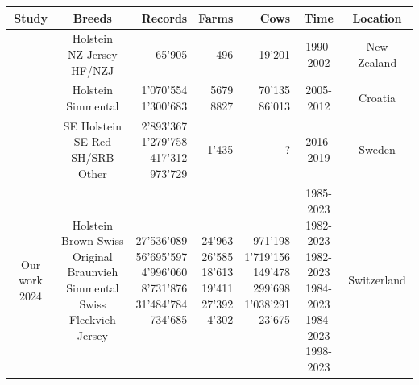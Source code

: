 \begin{table}[H]
    \centering
    \begin{tabular}{ccrrrcc}
        \textbf{Study} & \textbf{Breeds} & \textbf{Records} & \textbf{Farms} & \textbf{Cows} & \textbf{Time} & \textbf{Location} \\
        \hline
        \hline
        \multrow{\citeauthor{bryant_quantifying_2007} \\ \citeyear{bryant_quantifying_2007}} & \multrow{Holstein \\ NZ Jersey \\ HF/NZJ} & 65'905 & 496 & 19'201 & 1990-2002 & New Zealand \\
        \hline
        \multrow{\citeauthor{gantner_differences_2017} \\ \citeyear{gantner_differences_2017}} & \multrow{Holstein \\ Simmental} & \multrow{1'070'554 \\ 1'300'683} & \multrow{5679 \\ 8827} & \multrow{70'135 \\ 86'013} & 2005-2012 & Croatia \\
        \hline
        \multrow{\citeauthor{ahmed_temperature_2022} \\ \citeyear{ahmed_temperature_2022}} & \multrow{SE Holstein \\ SE Red \\ SH/SRB \\ Other} & \multrow{2’893’367 \\ 1’279’758 \\ 417’312 \\ 973’729} & 1'435 & ? & 2016-2019 & Sweden \\
        \hline
        \multrow{Our work \\ 2024} & \multrow{Holstein \\ Brown Swiss \\ Original Braunvieh \\ Simmental \\ Swiss Fleckvieh \\ Jersey} & \multrow{27'536'089 \\ 56'695'597 \\4'996'060 \\ 8'731'876 \\ 31'484'784 \\ 734'685} & \multrow{24'963 \\ 26'585 \\ 18'613 \\ 19'411 \\ 27'392 \\ 4'302} & \multrow{971'198 \\ 1'719'156 \\ 149'478 \\ 299'698 \\ 1'038'291 \\ 23'675 } & \multrow{1985-2023 \\ 1982-2023 \\ 1982-2023 \\ 1984-2023 \\ 1984-2023 \\ 1998-2023} & Switzerland \\

\end{tabular}
\end{table}
